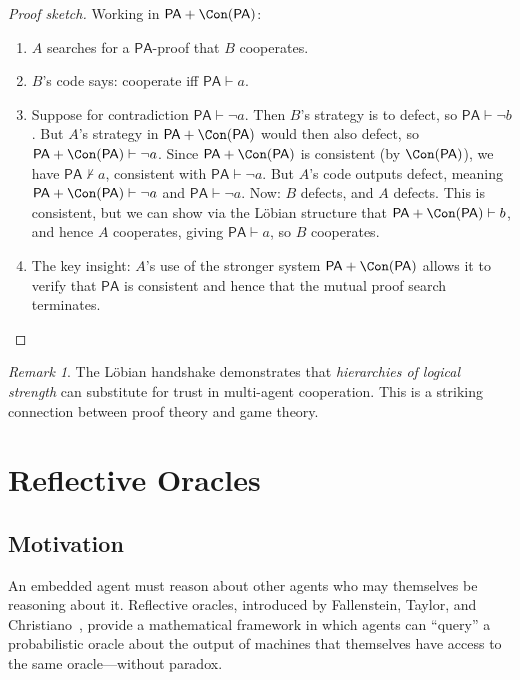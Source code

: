 \documentclass[11pt,a4paper]{article}
\theoremstyle{definition}
\theoremstyle{remark}
\newtheorem{remark}[theorem]{Remark}
\newcommand{\PA}{\mathsf{PA}}
\begin{document}
\begin{proof}[Proof sketch]
Working in $\PA + \Con(\PA)$:
\begin{enumerate}
  \item $A$ searches for a $\PA$-proof that $B$ cooperates.
  \item $B$'s code says: cooperate iff $\PA \vdash a$.
  \item Suppose for contradiction $\PA \vdash \neg a$.  Then $B$'s
    strategy is to defect, so $\PA \vdash \neg b$.  But $A$'s strategy
    in $\PA + \Con(\PA)$ would then also defect, so $\PA + \Con(\PA)
    \vdash \neg a$.  Since $\PA + \Con(\PA)$ is consistent (by
    $\Con(\PA)$), we have $\PA \nvdash a$, consistent with $\PA \vdash
    \neg a$.  But $A$'s code outputs defect, meaning $\PA + \Con(\PA)
    \vdash \neg a$ and $\PA \vdash \neg a$.  Now: $B$ defects, and $A$
    defects.  This is consistent, but we can show via the L\"obian
    structure that $\PA + \Con(\PA) \vdash b$, and hence $A$ cooperates,
    giving $\PA \vdash a$, so $B$ cooperates.
  \item The key insight: $A$'s use of the stronger system $\PA +
    \Con(\PA)$ allows it to verify that $\PA$ is consistent and hence
    that the mutual proof search terminates.
\end{enumerate}
\end{proof}

\begin{remark}
The L\"obian handshake demonstrates that \emph{hierarchies of logical
strength} can substitute for trust in multi-agent cooperation.  This is
a striking connection between proof theory and game theory.
\end{remark}

\section{Reflective Oracles}\label{sec:reflective-oracles}

\subsection{Motivation}

An embedded agent must reason about other agents who may themselves be
reasoning about it.  Reflective oracles, introduced by Fallenstein,
Taylor, and Christiano~\cite{fallenstein2015reflective}, provide a
mathematical framework in which agents can ``query'' a probabilistic
oracle about the output of machines that themselves have access to the
same oracle---without paradox.
\end{document}
